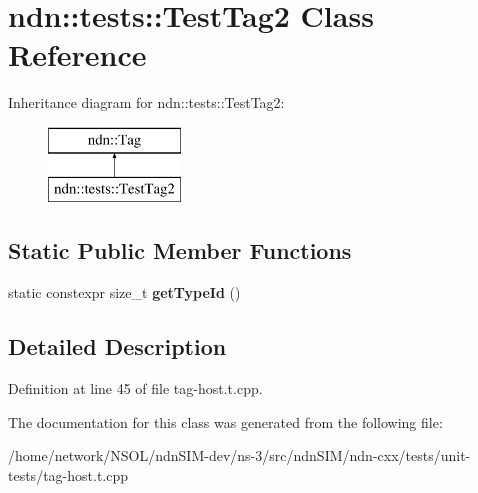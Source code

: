 \hypertarget{classndn_1_1tests_1_1TestTag2}{}\section{ndn\+:\+:tests\+:\+:Test\+Tag2 Class Reference}
\label{classndn_1_1tests_1_1TestTag2}
Inheritance diagram for ndn\+:\+:tests\+:\+:Test\+Tag2\+:\begin{figure}[H]
\begin{center}
\leavevmode
\includegraphics[height=2.000000cm]{classndn_1_1tests_1_1TestTag2}
\end{center}
\end{figure}
\subsection*{Static Public Member Functions}
\begin{DoxyCompactItemize}
\item 
static constexpr size\+\_\+t {\bfseries get\+Type\+Id} ()\hypertarget{classndn_1_1tests_1_1TestTag2_a072bb49109852c95456070f29d6517ac}{}\label{classndn_1_1tests_1_1TestTag2_a072bb49109852c95456070f29d6517ac}

\end{DoxyCompactItemize}


\subsection{Detailed Description}


Definition at line 45 of file tag-\/host.\+t.\+cpp.



The documentation for this class was generated from the following file\+:\begin{DoxyCompactItemize}
\item 
/home/network/\+N\+S\+O\+L/ndn\+S\+I\+M-\/dev/ns-\/3/src/ndn\+S\+I\+M/ndn-\/cxx/tests/unit-\/tests/tag-\/host.\+t.\+cpp\end{DoxyCompactItemize}
